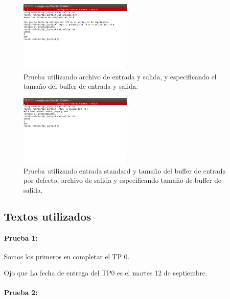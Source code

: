 \documentclass[a4paper]{article}
\begin{document}
\begin{figure}[!htp]
\begin{center}
\includegraphics[width=0.5\textwidth]{imagenes_casosDePrueba_tp1/prueba1_archivoEntrada_4_salida_4.png}
\caption{Prueba utilizando archivo de entrada y salida, y especificando el tamaño del buffer de entrada y salida.} \label{fig001}
\end{center}
\end{figure}

\begin{figure}[!htp]
\begin{center}
\includegraphics[width=0.5\textwidth]{imagenes_casosDePrueba_tp1/pruebaStdin_salida_4.png}
\caption{Prueba utilizando entrada standard y tamaño del buffer de entrada por defecto, archivo de salida y especificando tamaño de buffer de salida.} \label{fig001}
\end{center}
\end{figure}

\pagebreak
\subsection{Textos utilizados}

\paragraph{Prueba 1:}

Somos los primeros en completar el TP 0.

Ojo que La fecha de entrega del TP0 es el martes 12 de septiembre.

\paragraph{Prueba 2:}
\end{document}
